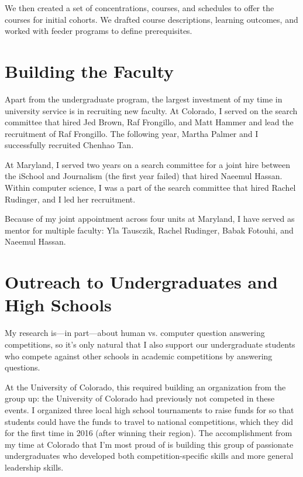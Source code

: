 \documentclass[11pt]{amsart}
\begin{document}
We then created a set of concentrations, courses, and schedules to
offer the courses for initial cohorts.  We drafted course
descriptions, learning outcomes, and worked with feeder programs to
define prerequisites.

\section{Building the Faculty}

Apart from the undergraduate program, the largest investment of my
time in university service is in recruiting new faculty.
%
At Colorado, I served on the search committee that 
hired Jed Brown, Raf Frongillo, and Matt Hammer and lead the
recruitment of Raf Frongillo.
%
The following year, Martha Palmer and I successfully recruited Chenhao
Tan.

At Maryland, I served two years on a search committee for a joint hire
between the iSchool and Journalism (the first year failed) that hired
Naeemul Hassan.
%
Within computer science, I was a part of the search committee that
hired Rachel Rudinger, and I led her recruitment.

Because of my joint appointment across four units at Maryland, I have
served as mentor for multiple faculty: Yla Tausczik, Rachel Rudinger,
Babak Fotouhi, and Naeemul Hassan.


\section{Outreach to Undergraduates and High Schools}


My research is---in part---about human vs. computer question answering
competitions, so it's only natural that I also support our
undergraduate students who compete against other schools in academic
competitions by answering questions.

At the University of Colorado, this required building an organization
from the group up: the University of Colorado had previously not
competed in these events.
%
I organized three local high school tournaments to raise funds for so that
students could have the funds to travel to national competitions, which
they did for the first time in 2016 (after winning their region).
%
The accomplishment from my time at Colorado that I'm most proud of is
building this group of passionate undergraduates who developed both
competition-specific skills and more general leadership skills.
\end{document}

